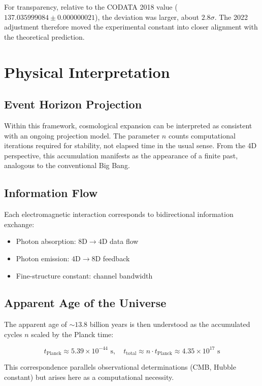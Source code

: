 \documentclass[pdflatex,sn-mathphys-num]{sn-jnl}
\theoremstyle{thmstyleone}
\theoremstyle{thmstyletwo}
\theoremstyle{thmstylethree}
\begin{document}
For transparency, relative to the CODATA 2018 value 
($137.035999084 \pm 0.000000021$), the deviation was larger, about $2.8\sigma$. 
The 2022 adjustment therefore moved the experimental constant into closer alignment 
with the theoretical prediction. 
\section{Physical Interpretation}\label{sec:s1-physical}
\subsection{Event Horizon Projection}\label{subsec:s1-horizon}
Within this framework, cosmological expansion can be interpreted as consistent with an ongoing projection model. The parameter $n$ counts computational iterations required for stability, not elapsed time in the usual sense. From the 4D perspective, this accumulation manifests as the appearance of a finite past, analogous to the conventional Big Bang.

\subsection{Information Flow}\label{subsec:s1-flow}
Each electromagnetic interaction corresponds to bidirectional information exchange:
\begin{itemize}
    \item Photon absorption: $8\text{D} \to 4\text{D}$ data flow
    \item Photon emission: $4\text{D} \to 8\text{D}$ feedback
    \item Fine-structure constant: channel bandwidth
\end{itemize}

\subsection{Apparent Age of the Universe}\label{subsec:s1-age}
The apparent age of $\sim 13.8$ billion years is then understood as the accumulated cycles $n$ scaled by the Planck time:

\begin{equation}
t_{\text{Planck}} \approx 5.39 \times 10^{-44} \text{ s}, \quad
t_{\text{total}} \approx n \cdot t_{\text{Planck}} \approx 4.35 \times 10^{17} \text{ s}
\end{equation}

This correspondence parallels observational determinations (CMB, Hubble constant) but arises here as a computational necessity.
\end{document}
